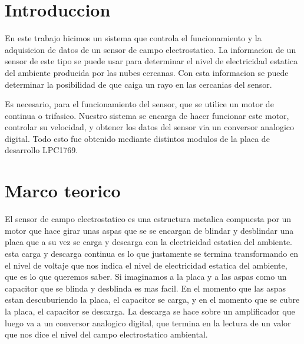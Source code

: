 \documentclass[a4paper]{article}
\begin{document}
\setcounter{page}{1}


\section{Introduccion} %
\label{sec:introduccion}


En este trabajo hicimos un sistema que controla el funcionamiento y la adquisicion de datos de un sensor de campo electrostatico. La informacion de un sensor de este tipo se puede usar para determinar el nivel de electricidad estatica del ambiente producida por las nubes cercanas. Con esta informacion se puede determinar la posibilidad de que caiga un rayo en las cercanias del sensor.

Es necesario, para el funcionamiento del sensor, que se utilice un motor de continua o trifasico. Nuestro sistema se encarga de hacer funcionar este motor, controlar su velocidad, y obtener los datos del sensor via un conversor analogico digital. Todo esto fue obtenido mediante distintos modulos de la placa de desarrollo LPC1769. 


\section{Marco teorico} %
\label{sec:marco_teorico}





El sensor de campo electrostatico es una estructura metalica compuesta por un motor que hace girar unas aspas que se se encargan de blindar y desblindar una placa que a su vez se carga y descarga con la electricidad estatica del ambiente. esta carga y descarga continua es lo que justamente se termina transformando en el nivel de voltaje que nos indica el nivel de electricidad estatica del ambiente, que es lo que queremos saber. Si imaginamos a la placa y a las aspas como un capacitor que se blinda y desblinda es mas facil. En el momento que las aspas estan descuburiendo la placa, el capacitor se carga, y en el momento que se cubre la placa, el capacitor se descarga. La descarga se hace sobre un amplificador que luego va a un conversor analogico digital, que termina en la lectura de un valor que nos dice el nivel del campo electrostatico ambiental.
\end{document}
